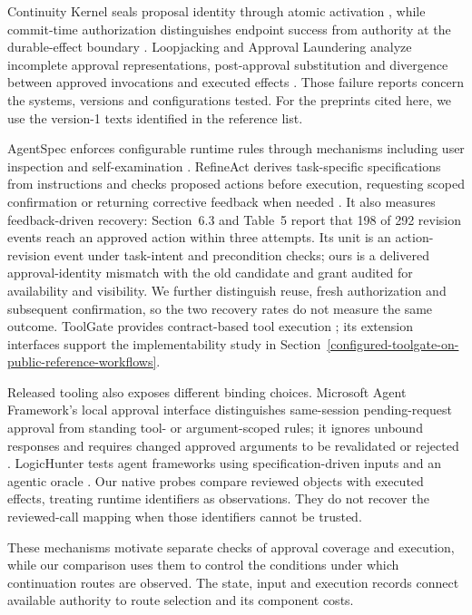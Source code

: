 \documentclass[pdflatex,sn-basic]{sn-jnl}
\begin{document}
Continuity Kernel seals proposal identity through atomic activation \citep{continuity-kernel}, while commit-time authorization distinguishes endpoint success from authority at the durable-effect boundary \citep{commit-time-auth}. Loopjacking and Approval Laundering analyze incomplete approval representations, post-approval substitution and divergence between approved invocations and executed effects \citep{kumar2026loopjacking,wang2026approval}. Those failure reports concern the systems, versions and configurations tested. For the preprints cited here, we use the version-1 texts identified in the reference list.

AgentSpec enforces configurable runtime rules through mechanisms including user inspection and self-examination \citep{agentspec2026}. RefineAct derives task-specific specifications from instructions and checks proposed actions before execution, requesting scoped confirmation or returning corrective feedback when needed \citep{refineact2026}. It also measures feedback-driven recovery: Section~6.3 and Table~5 report that 198 of 292 revision events reach an approved action within three attempts. Its unit is an action-revision event under task-intent and precondition checks; ours is a delivered approval-identity mismatch with the old candidate and grant audited for availability and visibility. We further distinguish reuse, fresh authorization and subsequent confirmation, so the two recovery rates do not measure the same outcome. ToolGate provides contract-based tool execution \citep{toolgate}; its extension interfaces support the implementability study in Section~\ref{configured-toolgate-on-public-reference-workflows}.

Released tooling also exposes different binding choices. Microsoft Agent Framework's local approval interface distinguishes same-session pending-request approval from standing tool- or argument-scoped rules; it ignores unbound responses and requires changed approved arguments to be revalidated or rejected \citep{msaf-tool-approval}. LogicHunter tests agent frameworks using specification-driven inputs and an agentic oracle \citep{logicunter}. Our native probes compare reviewed objects with executed effects, treating runtime identifiers as observations. They do not recover the reviewed-call mapping when those identifiers cannot be trusted.

These mechanisms motivate separate checks of approval coverage and execution, while our comparison uses them to control the conditions under which continuation routes are observed. The state, input and execution records connect available authority to route selection and its component costs.
\end{document}
